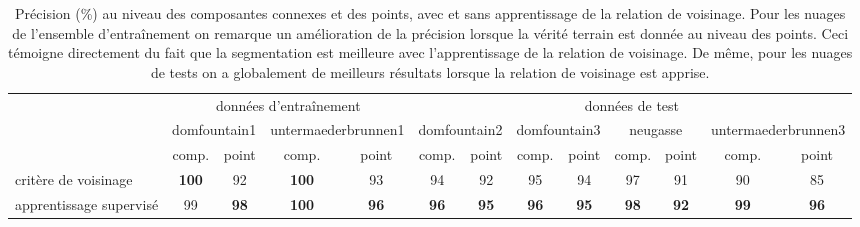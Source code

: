 \begin{table}[p]
\tiny
\begin{tabular}{l|c|c|c|c|c|c|c|c|c|c|c|c|}
\cline{2-13}
                                              & \multicolumn{4}{c|}{données d'entraînement}                                  & \multicolumn{8}{c|}{données de test}                                                                                                             \\ \cline{2-13} 
                                              & \multicolumn{2}{c|}{domfountain1} & \multicolumn{2}{c|}{untermaederbrunnen1} & \multicolumn{2}{c|}{domfountain2} & \multicolumn{2}{c|}{domfountain3} & \multicolumn{2}{c|}{neugasse} & \multicolumn{2}{c|}{untermaederbrunnen3} \\ \cline{2-13} 
                                              & comp.            & point          & comp.               & point              & comp.           & point           & comp.           & point           & comp.         & point         & comp.               & point              \\ \hline
\multicolumn{1}{|l|}{critère de voisinage}    & \textbf{100}     & 92             & \textbf{100}        & 93                 & 94              & 92              & 95              & 94              & 97            & 91            & 90                  & 85                 \\ \hline
\multicolumn{1}{|l|}{apprentissage supervisé} & 99               & \textbf{98}    & \textbf{100}        & \textbf{96}        & \textbf{96}     & \textbf{95}     & \textbf{96}     & \textbf{95}     & \textbf{98}   & \textbf{92}   & \textbf{99}         & \textbf{96}        \\ \hline
\end{tabular}
\caption{Précision (\%) au niveau des composantes connexes et des points, avec et sans apprentissage de la relation de voisinage. Pour les nuages de l'ensemble d'entraînement on remarque un amélioration de la précision lorsque la vérité terrain est donnée au niveau des points. Ceci témoigne directement du fait que la segmentation est meilleure avec l'apprentissage de la relation de voisinage. De même, pour les nuages de tests on a globalement de meilleurs résultats lorsque la relation de voisinage est apprise.}
\label{table:neighbourhood}
\end{table}